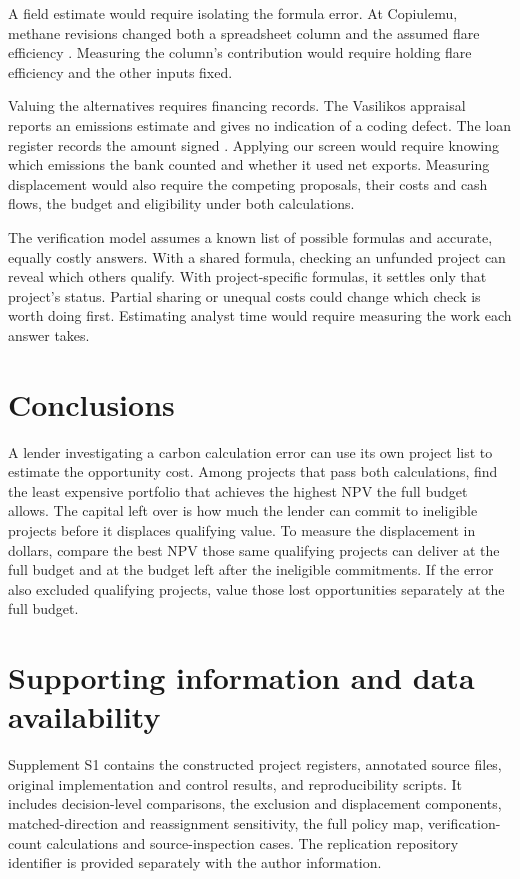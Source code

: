 A field estimate would require isolating the formula error. At Copiulemu, methane revisions changed both a spreadsheet column and the assumed flare efficiency \citep[pp.~9--11, 14]{sgs}. Measuring the column's contribution would require holding flare efficiency and the other inputs fixed.

Valuing the alternatives requires financing records. The Vasilikos appraisal reports an emissions estimate and gives no indication of a coding defect. The loan register records the amount signed \citep{eibscore,eibloan}. Applying our screen would require knowing which emissions the bank counted and whether it used net exports. Measuring displacement would also require the competing proposals, their costs and cash flows, the budget and eligibility under both calculations.

The verification model assumes a known list of possible formulas and accurate, equally costly answers. With a shared formula, checking an unfunded project can reveal which others qualify. With project-specific formulas, it settles only that project's status. Partial sharing or unequal costs could change which check is worth doing first. Estimating analyst time would require measuring the work each answer takes.

\section{Conclusions}
A lender investigating a carbon calculation error can use its own project list to estimate the opportunity cost. Among projects that pass both calculations, find the least expensive portfolio that achieves the highest NPV the full budget allows. The capital left over is how much the lender can commit to ineligible projects before it displaces qualifying value. To measure the displacement in dollars, compare the best NPV those same qualifying projects can deliver at the full budget and at the budget left after the ineligible commitments. If the error also excluded qualifying projects, value those lost opportunities separately at the full budget.

\section*{Supporting information and data availability}
Supplement S1 contains the constructed project registers, annotated source files, original implementation and control results, and reproducibility scripts. It includes decision-level comparisons, the exclusion and displacement components, matched-direction and reassignment sensitivity, the full policy map, verification-count calculations and source-inspection cases. The replication repository identifier is provided separately with the author information.
